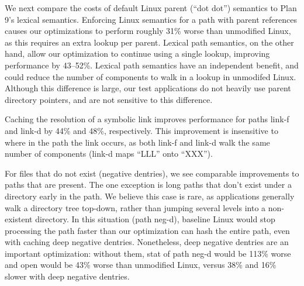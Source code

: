 We next compare the costs of default Linux parent (``dot dot'') semantics 
to Plan 9's lexical semantics.  Enforcing 
Linux semantics for a path with parent references causes our optimizations
to perform roughly 31\% worse than unmodified Linux, as this requires an extra lookup 
per parent.
Lexical path semantics, on the other hand, allow our optimization to continue using a single
lookup, improving performance by 43--52\%.  Lexical path semantics
have an independent benefit, and could reduce the number of components
to walk in a lookup in unmodifed Linux.  
Although this difference is large, our test applications do not heavily use 
parent directory pointers, and are not sensitive to this difference.

Caching the resolution of a symbolic link improves 
performance for paths link-f and link-d by 44\% and 48\%, respectively.
This improvement is insensitive to where in the path the link occurs, 
as both link-f and link-d walk the same number of components (link-d maps ``LLL'' onto ``XXX'').

For files that do not exist (negative dentries), 
we see comparable improvements to paths that are present.  The one exception is
long paths that don't exist under a directory early in the path.
We believe this case is rare, as applications generally walk a directory tree top-down, rather than jumping
several levels into a non-existent directory.
In this situation (path neg-d), baseline Linux would stop processing the path faster
than our optimization can hash the entire path, even with caching deep negative dentries.
Nonetheless, deep negative dentries are an important optimization:
without them, stat of path neg-d would be 113\% worse 
and open would be 43\% worse than unmodified Linux, versus 38\% and 16\% slower with
deep negative dentries.





